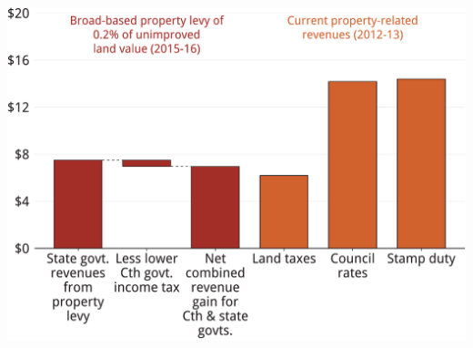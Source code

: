\documentclass[tikz]{standalone}\usepackage[]{graphicx}\usepackage[]{color}
\newenvironment{knitrout}{}{} %
\begin{document}
\begin{knitrout}
\color{fgcolor}
\includegraphics[width=11.000in,height=8in]{./Property-taxes/atlas/figure/PROP-Figure5-1} 

\end{knitrout}
\end{document}
